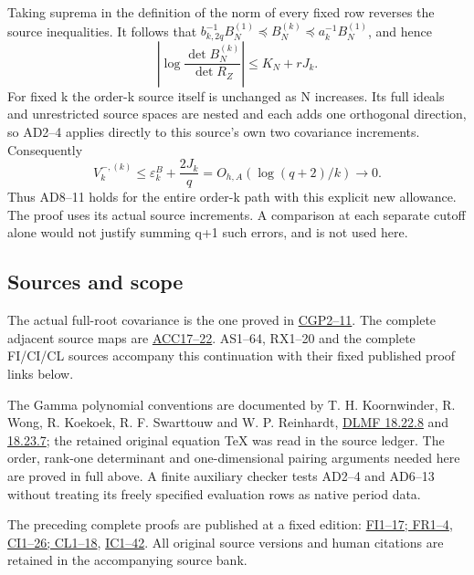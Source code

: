 \documentclass[11pt]{article}
\begin{document}
Taking suprema in the definition of the norm of every fixed row reverses the source inequalities. It follows that \(b_{k,2q}^{-1}B_N^{(1)}\preceq B_N^{(k)}\preceq a_k^{-1}B_N^{(1)}\), and hence \[
\left|\log\frac{\det B_N^{(k)}}{\det R_Z}\right|
\le K_N+rJ_k.
\] For fixed k the order-k source itself is unchanged as N increases. Its full ideals and unrestricted source spaces are nested and each adds one orthogonal direction, so AD2--4 applies directly to this source's own two covariance increments. Consequently \[
V_k^{-,(k)}\le\varepsilon_k^B+\frac{2J_k}{q}
=O_{h,A}(\log(q+2)/k)\longrightarrow0.
\tag{AD14}
\] Thus AD8--11 holds for the entire order-k path with this explicit new allowance. The proof uses its actual source increments. A comparison at each separate cutoff alone would not justify summing q+1 such errors, and is not used here.

\subsection{Sources and scope}\label{sources-and-scope}

The actual full-root covariance is the one proved in \href{https://github.com/KokunoYumeto/zeta-function-research-reader/blob/7230c00b9f07dd222b2aea95427d67918f3a8cac/workbenches/splitzero-tandem/continuations/20260921-local-covariance-activation/010/ORIGINAL_PROJECTION_CAUCHY_ACTION.tex}{CGP2--11}. The complete adjacent source maps are \href{https://github.com/KokunoYumeto/zeta-function-research-reader/blob/7230c00b9f07dd222b2aea95427d67918f3a8cac/workbenches/splitzero-tandem/continuations/20260921-local-covariance-activation/010/ORIGINAL_ADJACENT_CUTOFF_CURRENT.tex}{ACC17--22}. AS1--64, RX1--20 and the complete FI/CI/CL sources accompany this continuation with their fixed published proof links below.

The Gamma polynomial conventions are documented by T. H. Koornwinder, R. Wong, R. Koekoek, R. F. Swarttouw and W. P. Reinhardt, \href{https://dlmf.nist.gov/18.22.E8}{DLMF 18.22.8} and \href{https://dlmf.nist.gov/18.23.E7}{18.23.7}; the retained original equation TeX was read in the source ledger. The order, rank-one determinant and one-dimensional pairing arguments needed here are proved in full above. A finite auxiliary checker tests AD2--4 and AD6--13 without treating its freely specified evaluation rows as native period data.

The preceding complete proofs are published at a fixed edition: \href{https://github.com/KokunoYumeto/zeta-function-research-reader/blob/75256b0237884bdef0074c2ac6310de1ea32ec26/workbenches/splitzero-tandem/continuations/20260921-invariant-collision/FINITE_INVARIANT_PROOFS.md}{FI1--17; FR1--4}, \href{https://github.com/KokunoYumeto/zeta-function-research-reader/blob/75256b0237884bdef0074c2ac6310de1ea32ec26/workbenches/splitzero-tandem/continuations/20260921-invariant-collision/CUTOFF_INNOVATION_PROOFS.md}{CI1--26; CL1--18}, \href{https://github.com/KokunoYumeto/zeta-function-research-reader/blob/75256b0237884bdef0074c2ac6310de1ea32ec26/workbenches/splitzero-tandem/continuations/20260921-invariant-collision/COLLISION_PROOFS.md}{IC1--42}. All original source versions and human citations are retained in the accompanying source bank.
\end{document}

